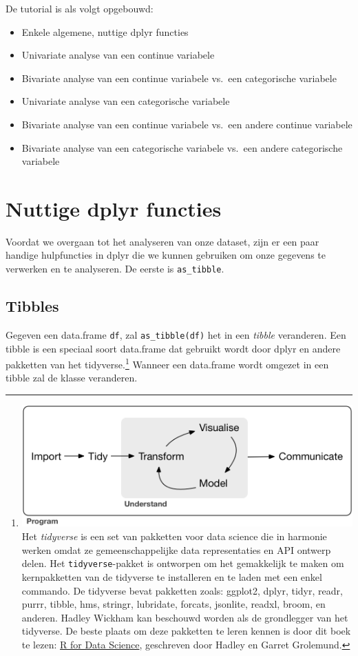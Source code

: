 \documentclass[]{tufte-book}
\providecommand{\tightlist}{%
  \setlength{\itemsep}{0pt}\setlength{\parskip}{0pt}}
\begin{document}
De tutorial is als volgt opgebouwd:

\begin{itemize}
\tightlist
\item
  Enkele algemene, nuttige dplyr functies
\item
  Univariate analyse van een continue variabele
\item
  Bivariate analyse van een continue variabele vs.~een categorische variabele
\item
  Univariate analyse van een categorische variabele
\item
  Bivariate analyse van een continue variabele vs.~een andere continue variabele
\item
  Bivariate analyse van een categorische variabele vs.~een andere categorische variabele
\end{itemize}

\hypertarget{nuttige-dplyr-functies}{%
\section{Nuttige dplyr functies}\label{nuttige-dplyr-functies}}

Voordat we overgaan tot het analyseren van onze dataset, zijn er een paar handige hulpfuncties in dplyr die we kunnen gebruiken om onze gegevens te verwerken en te analyseren. De eerste is \texttt{as\_tibble}.

\hypertarget{tibbles}{%
\subsection{Tibbles}\label{tibbles}}

Gegeven een data.frame \texttt{df}, zal \texttt{as\_tibble(df)} het in een \emph{tibble} veranderen. Een tibble is een speciaal soort data.frame dat gebruikt wordt door dplyr en andere pakketten van het tidyverse.\footnote{\includegraphics{images/tidyverse.png} Het \emph{tidyverse} is een set van pakketten voor data science die in harmonie werken omdat ze gemeenschappelijke data representaties en API ontwerp delen. Het \texttt{tidyverse}-pakket is ontworpen om het gemakkelijk te maken om kernpakketten van de tidyverse te installeren en te laden met een enkel commando. De tidyverse bevat pakketten zoals: ggplot2, dplyr, tidyr, readr, purrr, tibble, hms, stringr, lubridate, forcats, jsonlite, readxl, broom, en anderen. Hadley Wickham kan beschouwd worden als de grondlegger van het tidyverse. De beste plaats om deze pakketten te leren kennen is door dit boek te lezen: \href{http://r4ds.had.co.nz/}{R for Data Science}, geschreven door Hadley en Garret Grolemund.} Wanneer een data.frame wordt omgezet in een tibble zal de klasse veranderen.
\end{document}
